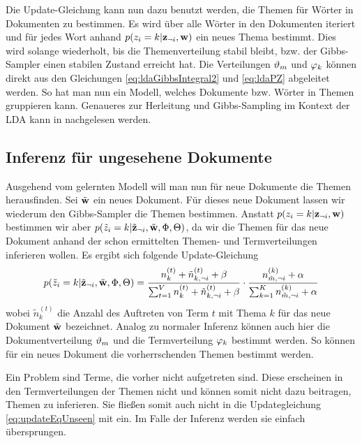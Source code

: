 Die Update-Gleichung kann nun dazu benutzt werden, die Themen für Wörter in Dokumenten zu bestimmen. Es wird über alle Wörter in den Dokumenten iteriert und für jedes Wort anhand $p(z_i=k|\mathbf{z}_{\neg i},\mathbf{w})$ ein neues Thema bestimmt. Dies wird solange wiederholt, bis die Themenverteilung stabil bleibt, bzw. der Gibbs-Sampler einen stabilen Zustand erreicht hat. Die Verteilungen $\vartheta_{m}$ und $\varphi_{k}$ können direkt aus den Gleichungen \ref{eq:ldaGibbsIntegral2} und \ref{eq:ldaPZ} abgeleitet werden. So hat man nun ein Modell, welches Dokumente bzw. Wörter in Themen gruppieren kann. Genaueres zur Herleitung und Gibbs-Sampling im Kontext der LDA kann in \citep{Griffiths2004LDA} nachgelesen werden.

\subsection{Inferenz für ungesehene Dokumente}
\label{subsec:infUnseen}

Ausgehend vom gelernten Modell will man nun für neue Dokumente die Themen herausfinden. Sei $\tilde{\mathbf{w}}$ ein neues Dokument. Für dieses neue Dokument lassen wir wiederum den Gibbs-Sampler die Themen bestimmen. Anstatt $p(z_i=k|\mathbf{z}_{\neg i},\mathbf{w})$ bestimmen wir aber $p(\tilde{z}_i=k|\tilde{\mathbf{z}}_{\neg i},\tilde{\mathbf{w}},\Phi,\Theta)$, da wir die Themen für das neue Dokument anhand der schon ermittelten Themen- und Termverteilungen inferieren wollen. Es ergibt sich folgende Update-Gleichung
\begin{equation}
p(\tilde{z}_i=k|\tilde{\mathbf{z}}_{\neg i},\tilde{\mathbf{w}},\Phi,\Theta) = \frac{n^{(t)}_{k}+\tilde{n}^{(t)}_{k, \neg i}+\beta}{\sum^V_{t=1}n^{(t)}_{k}+\tilde{n}^{(t)}_{k, \neg i}+\beta}\cdot \frac{n^{(k)}_{\tilde{m},\neg i}+\alpha}{\sum^K_{k=1}n^{(k)}_{\tilde{m},\neg i}+\alpha} 
\label{eq:updateEqUnseen}
\end{equation}
wobei $\tilde{n}^{(t)}_{k}$ die Anzahl des Auftreten von Term $t$ mit Thema $k$ für das neue Dokument $\tilde{\mathbf{w}}$ bezeichnet. Analog zu normaler Inferenz können auch hier die Dokumentverteilung $\vartheta_{m}$ und die Termverteilung $\varphi_{k}$ bestimmt werden. So können für ein neues Dokument die vorherrschenden Themen bestimmt werden. 

Ein Problem sind Terme, die vorher nicht aufgetreten sind. Diese erscheinen in den Termverteilungen der Themen nicht und können somit nicht dazu beitragen, Themen zu inferieren. Sie fließen somit auch nicht in die Updategleichung \ref{eq:updateEqUnseen} mit ein. Im Falle der Inferenz werden sie einfach übersprungen.


